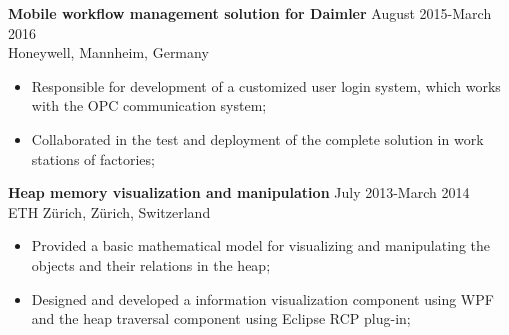 \documentclass[margin, 10pt]{res} %
\begin{document}
\begin{resume}
\begin{CJK}{UTF8}{gbsn}
\textbf{Mobile workflow management solution for Daimler} \hfill August 2015-March 2016\\
Honeywell, Mannheim, Germany
\begin{itemize} \itemsep -2pt %
\item Responsible for development of a customized user login system, which works with the OPC communication system;
\item Collaborated in the test and deployment of the complete solution in work stations of factories;
\end{itemize}


\textbf{Heap memory visualization and manipulation} \hfill July 2013-March 2014\\
ETH Zürich, Zürich, Switzerland
\begin{itemize} \itemsep -2pt %
\item Provided a basic mathematical model for visualizing and manipulating the objects and their relations in the heap;
\item Designed and developed a information visualization component using WPF and the heap traversal component using Eclipse RCP plug-in;
\end{itemize} 



\end{CJK}
\end{resume}
\end{document}
